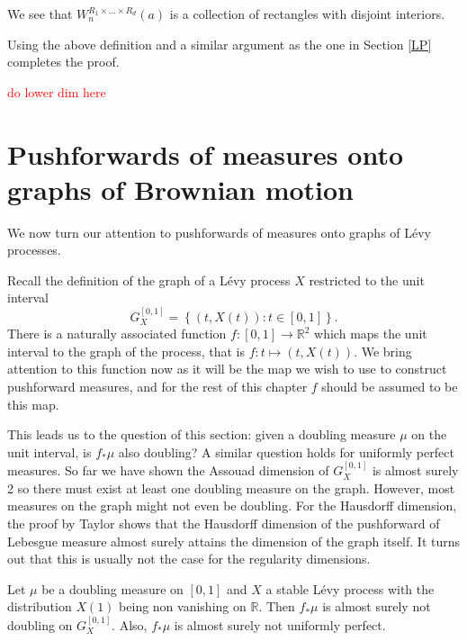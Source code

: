 We see that $W_{n}^{R_1\times\dots\times R_d}(a)$ is a collection of rectangles with disjoint interiors.

Using the above definition and a similar argument as the one in Section \ref{LP} completes the proof.




\textcolor{red}{do lower dim here}
















\section{Pushforwards of measures onto graphs of Brownian motion}


We now turn our attention to pushforwards of measures onto graphs of L\'evy processes.


Recall the definition of the graph of a L\'evy process $X$ restricted to the unit interval
\[
G_X^{[0,1]} = \left\{ (t,X(t)) \colon t \in [0,1] \right\}.
\]
There is a naturally associated function $f: [0,1] \rightarrow \mathbb{R}^2$ which maps the unit interval to the graph of the process, that is $f\colon t \mapsto (t,X(t))$. We bring attention to this function now as it will be the map we wish to use to construct pushforward measures, and for the rest of this chapter $f$ should be assumed to be this map. 





This leads us to the question of this section: given a doubling measure $\mu$ on the unit interval, is $f_*\mu$ also doubling? A similar question holds for uniformly perfect measures. So far we have shown the Assouad dimension of $G_X^{[0,1]}$ is almost surely 2 so there must exist at least one doubling measure on the graph. However, most measures on the graph might not even be doubling. For the Hausdorff dimension, the proof by Taylor shows that the Hausdorff dimension of the pushforward of Lebesgue measure almost surely attains the dimension of the graph itself. It turns out that this is usually not the case for the regularity dimensions.

\begin{theorem}\label{brownianthm}
	Let $\mu$ be a doubling measure on $[0,1]$ and $X$ a stable L\'evy process with the distribution $X(1)$ being non vanishing on $\mathbb{R}$. Then $f_*\mu$ is almost surely not doubling on $G_X^{[0,1]}$. Also, $f_*\mu$ is almost surely not uniformly perfect.
\end{theorem}



